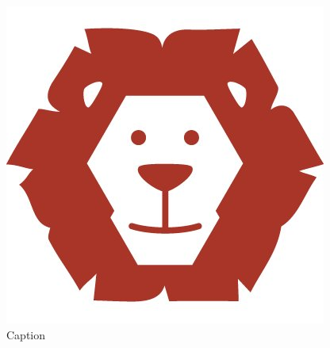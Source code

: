 \begin{figure}[h!]
    \centering
    \includegraphics{_Floats/Lion.jpg}
    \caption{Caption}
    \label{fig:my_label}
\end{figure}